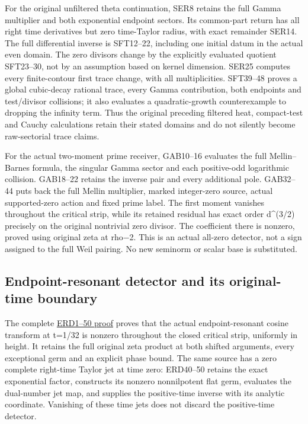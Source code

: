 \documentclass[
  10pt,
  a4paper,
]{article}
\begin{document}
For the original unfiltered theta continuation, SER8 retains the full
Gamma multiplier and both exponential endpoint sectors. Its common-part
return has all right time derivatives but zero time-Taylor radius, with
exact remainder SER14. The full differential inverse is SFT12--22,
including one initial datum in the actual even domain. The zero divisors
change by the explicitly evaluated quotient SFT23--30, not by an
assumption based on kernel dimension. SER25 computes every
finite-contour first trace change, with all multiplicities. SFT39--48
proves a global cubic-decay rational trace, every Gamma contribution,
both endpoints and test/divisor collisions; it also evaluates a
quadratic-growth counterexample to dropping the infinity term. Thus the
original preceding filtered heat, compact-test and Cauchy calculations
retain their stated domains and do not silently become raw-sectorial
trace claims.

For the actual two-moment prime receiver, GAB10--16 evaluates the full
Mellin--Barnes formula, the singular Gamma sector and each positive-odd
logarithmic collision. GAB18--22 retains the inverse pair and every
additional pole. GAB32--44 puts back the full Mellin multiplier, marked
integer-zero source, actual supported-zero action and fixed prime label.
The first moment vanishes throughout the critical strip, while its
retained residual has exact order d\^{}(3/2) precisely on the original
nontrivial zero divisor. The coefficient there is nonzero, proved using
original zeta at rho−2. This is an actual all-zero detector, not a sign
assigned to the full Weil pairing. No new seminorm or scalar base is
substituted.

\subsection{Endpoint-resonant detector and its original-time
boundary}\label{endpoint-resonant-detector-and-its-original-time-boundary}

The complete \href{ENDPOINT_RESONANT_ZERO_DETECTION.md}{ERD1--50 proof}
proves that the actual endpoint-resonant cosine transform at t=1/32 is
nonzero throughout the closed critical strip, uniformly in height. It
retains the full original zeta product at both shifted arguments, every
exceptional germ and an explicit phase bound. The same source has a zero
complete right-time Taylor jet at time zero: ERD40--50 retains the exact
exponential factor, constructs its nonzero nonnilpotent flat germ,
evaluates the dual-number jet map, and supplies the positive-time
inverse with its analytic coordinate. Vanishing of these time jets does
not discard the positive-time detector.
\end{document}
